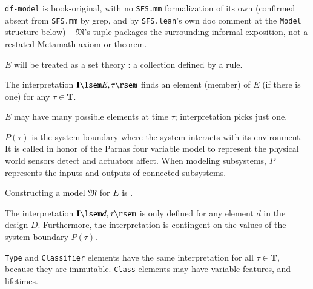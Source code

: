 \pn \texttt{df-model} is book-original, with no \texttt{SFS.mm} formalization of its own (confirmed absent from
\texttt{SFS.mm} by grep, and by \texttt{SFS.lean}'s own doc comment at the \texttt{Model} structure below) --
$\mathfrak{M}$'s tuple packages the surrounding informal exposition, not a restated Metamath axiom or theorem.

\pn $E$ will be treated as a set theory :  a collection defined by a rule.

\pn The interpretation $\mathbf{I}\lsem E,\tau\rsem$ finds an element (member) of $E$ (if there is one) for any $\tau \in \mathbf{T}$.

\pn $E$ may have many possible elements at time $\tau$; interpretation picks just one.


\pn $P(\tau)$ is the system boundary where the system interacts with its environment.  It is called  in honor of the Parnas four variable model to represent the physical world sensors detect and actuators affect.  When modeling subsystems, $P$ represents the inputs and outputs of connected subsystems.

\pn Constructing a model $\mathfrak{M}$  for $E$ is .


\pn The interpretation $\mathbf{I}\lsem d,\tau\rsem$ is only defined for any element $d$ in the design $D$.
Furthermore, the interpretation is contingent on the values of the system boundary $P(\tau)$.

\pn \texttt{Type} and  \texttt{Classifier} elements have the same interpretation for all $\tau\in\mathbf{T}$, because they are immutable.  \texttt{Class} elements may have variable features, and lifetimes.


